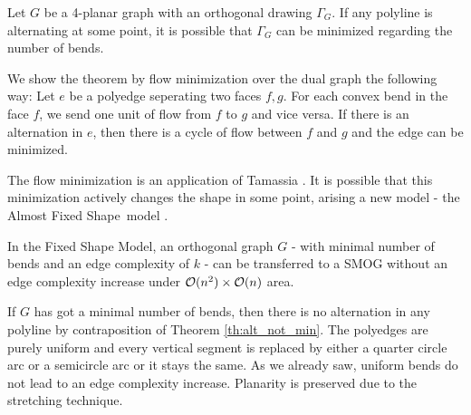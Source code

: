 \begin{theorem}
	Let $G$ be a 4-planar graph with an orthogonal drawing $\Gamma_G$. If any polyline is alternating at some point, it is possible that $\Gamma_G$ can be minimized regarding the number of bends. \label{th:alt_not_min}
\end{theorem}
\begin{sketch}
	We show the theorem by flow minimization over the dual graph the following way: Let $e$ be a polyedge seperating two faces $f,g$. For each convex bend in the face $f$, we send one unit of flow from $f$ to $g$ and vice versa. If there is an alternation in $e$, then there is a cycle of flow between $f$ and $g$ and the edge can be minimized.%
\end{sketch}
The flow minimization is an application of Tamassia \cite{Tamassia}. It is possible that this minimization actively changes the shape in some point, arising a new model - the \grqq Almost Fixed Shape\grqq~model \cite{LombardiFlow}.
\begin{theorem}
	In the Fixed Shape Model, an orthogonal graph $G$ - with minimal number of bends and an edge complexity of $k$ - can be transferred to a SMOG without an edge complexity increase under $\mathcal{O}(n^2) \times \mathcal{O}(n)$ area.
\end{theorem}
\begin{sketch}
	If $G$ has got a minimal number of bends, then there is no alternation in any polyline by contraposition of Theorem \ref{th:alt_not_min}. The polyedges are purely uniform and every vertical segment is replaced by either a quarter circle arc or a semicircle arc or it stays the same. As we already saw, uniform bends do not lead to an edge complexity increase. Planarity is preserved due to the stretching technique.
\end{sketch}
